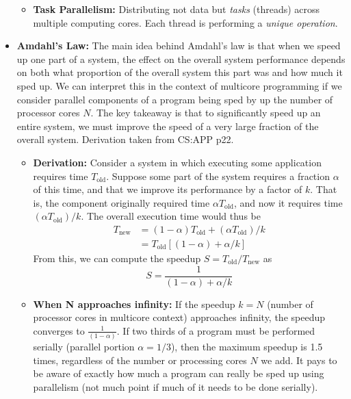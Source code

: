 \documentclass[12pt]{article}
\begin{document}
\begin{itemize}
\begin{itemize}
            \item \textbf{Task Parallelism:} Distributing not data but \textit{tasks} (threads) across multiple computing cores. Each thread is performing a \textit{unique operation}.
        \end{itemize}
    \item \textbf{Amdahl's Law:} The main idea behind Amdahl's law is that when we speed up one part of a system, the effect on the overall system performance depends on both what proportion of the overall system this part was and how much it sped up. We can interpret this in the context of multicore programming if we consider parallel components of a program being sped by up the number of processor cores \(N\). The key takeaway is that to significantly speed up an entire system, we must improve the speed of a very large fraction of the overall system. Derivation taken from CS:APP p22.
        \begin{itemize}
            \item \textbf{Derivation:} Consider a system in which executing some application requires time \(T_{\text{old}}\). Suppose some part of the system requires a fraction \(\alpha\) of this time, and that we improve its performance by a factor of \(k\). That is, the component originally required time \(\alpha T_{\text{old}}\), and now it requires time \((\alpha T_{\text{old}}) / k\). The overall execution time would thus be
                \begin{align*}
                    T_{\text{new}} & = (1 - \alpha) T_{\text{old}} + (\alpha T_{\text{old}}) / k \\
                                   & = T_{\text{old}} [(1 - \alpha) + \alpha / k]
                \end{align*}
                From this, we can compute the speedup \(S = T_{\text{old}} / T_{\text{new}}\) as
                \[S = \frac{1}{(1 - \alpha) + \alpha / k}\]
            \item \textbf{When N approaches infinity:} If the speedup \(k = N\) (number of processor cores in multicore context) approaches infinity, the speedup converges to \(\frac{1}{(1 - \alpha)}\). If two thirds of a program must be performed serially (parallel portion \(\alpha = 1/3\)), then the maximum speedup is 1.5 times, regardless of the number or processing cores \(N\) we add. It pays to be aware of exactly how much a program can really be sped up using parallelism (not much point if much of it needs to be done serially).
        \end{itemize}
\end{itemize}
\end{document}
